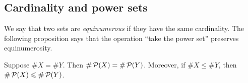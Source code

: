 \subsection*{Cardinality and power sets}

We say that two sets are \emph{equinumerous} if they have the same cardinality. The following proposition says that the operation ``take the power set'' preserves equinumerosity.

\begin{prop} \label{prop:PowerSetsPreserveEquinumerosity}
	Suppose $\# X=\# Y$. Then $\# \operatorname{\mathcal{P}}(X)=\# \operatorname{\mathcal{P}}(Y)$. Moreover, if $\# X\leq\# Y$, then $\# \operatorname{\mathcal{P}}(X)\leqslant\# \operatorname{\mathcal{P}}(Y)$.
\end{prop}

